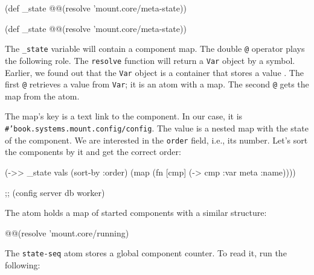 \ifnarrow

\begin{english}
  \begin{clojure}
(def _state
  @@(resolve 'mount.core/meta-state))
  \end{clojure}
\end{english}

\else

\begin{english}
  \begin{clojure}
(def _state @@(resolve 'mount.core/meta-state))
  \end{clojure}
\end{english}

\fi


The \verb|_state| variable will contain a component map. The double \verb|@| operator plays the following role. The \verb|resolve| function will return a \verb|Var| object by a symbol. Earlier, we found out that the \verb|Var| object is a container that stores a value . The first \verb|@| retrieves a value from \verb|Var|; it is an atom with a map. The second \verb|@| gets the map from the atom.


The map's key is a text link to the component. In our case, it is \texttt{\#'book.systems.mount\-.config/config}. The value is a nested map with the state of the component. We are interested in the \verb|order| field, i.e., its number. Let's sort the components by it and get the correct order:

\begin{english}
  \begin{clojure}
(->> _state
     vals (sort-by :order)
     (map (fn [cmp]
            (-> cmp :var meta :name))))

;; (config server db worker)
  \end{clojure}
\end{english}

The  atom holds a map of started components with a similar structure:

\begin{english}
  \begin{clojure}
@@(resolve 'mount.core/running)
  \end{clojure}
\end{english}

The \verb|state-seq| atom stores a global component counter. To read it, run the following:

